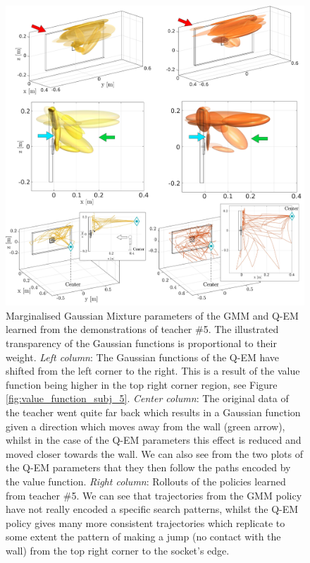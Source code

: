  \begin{figure}
    \centering
    \includegraphics[width=\textwidth]{./ch4-PiH/Figures/Fig/gmm_v2c.pdf}
    \caption{Marginalised Gaussian Mixture parameters of the GMM and Q-EM learned from the demonstrations of teacher \#5. 
    The illustrated transparency of the Gaussian functions is proportional to their weight.
    \textit{Left column}: The Gaussian functions of the Q-EM have shifted from the left corner to the right. This is a result of the value function 
    being higher in the top right corner region, see Figure \ref{fig:value_function_subj_5}. \textit{Center column}:  The original data of the teacher 
    went quite far back which results in a Gaussian function given a direction which moves away from the wall (green arrow), whilst in the case
    of the Q-EM parameters this effect is reduced and moved closer towards the wall.  We can also see from the two plots of the Q-EM parameters 
    that they then follow the paths encoded by the value function.    
    \textit{Right column}: Rollouts of the policies learned from teacher \#5. We can see that trajectories from the GMM policy have not really 
    encoded a specific search patterns, whilst the Q-EM policy gives many more consistent trajectories which replicate to some extent 
    the pattern of making a jump (no contact with the wall) from the top right corner to the socket's edge.}
    \label{fig:gmm_exp4}
\end{figure}
 
